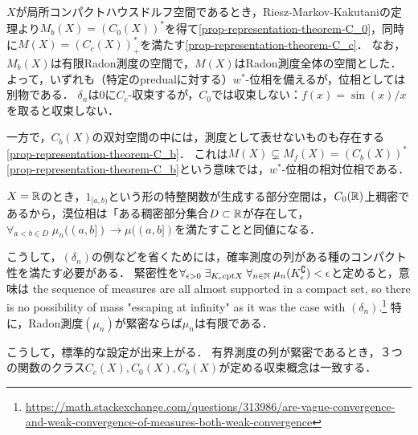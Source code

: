 \documentclass[uplatex,dvipdfmx]{jsreport}
\begin{document}
\begin{example}[局所コンパクトハウスドルフ空間での例]
    $X$が局所コンパクトハウスドルフ空間であるとき，Riesz-Markov-Kakutaniの定理より$M_b(X)=(C_0(X))^*$を得て\ref{prop-representation-theorem-C_0}，同時に$M(X)=(C_c(X))^*_+$を満たす\ref{prop-representation-theorem-C_c}．
    なお，$M_b(X)$は有限Radon測度の空間で，$M(X)$はRadon測度全体の空間とした．
    よって，いずれも（特定のpredualに対する）$w^*$-位相を備えるが，位相としては別物である．
    $\delta_n$は$0$に$C_c$-収束するが，$C_0$では収束しない：$f(x)=\sin(x)/x$を取ると収束しない．

    一方で，$C_b(X)$の双対空間の中には，測度として表せないものも存在する\ref{prop-representation-theorem-C_b}．
    これは$M(X)\subsetneq M_f(X)=(C_b(X))^*$\ref{prop-representation-theorem-C_b}という意味では，$w^*$-位相の相対位相である．
\end{example}

\begin{example}[実数上の測度の収束]
    $X=\mathbb{R}$のとき，$1_{[a,b)}$という形の特整関数が生成する部分空間は，$C_0(\mathbb{R})$上稠密であるから，漠位相は「ある稠密部分集合$D\subset\mathbb{R}$が存在して，$\forall_{a<b\in D}\;\mu_n((a,b])\to\mu((a,b])$を満たすことと同値になる．
\end{example}

\begin{remarks}
    こうして，$(\delta_n)$の例などを省くためには，確率測度の列がある種のコンパクト性を満たす必要がある．
    緊密性を$\forall_{\epsilon>0}\;\exists_{K_\epsilon\mathrm{cpt} X}\;\forall_{n\in\mathbb{N}}\;\mu_n(K_\epsilon^\complement)<\epsilon$と定めると，意味は
    the sequence of measures are all almost supported in a compact set, so there is no possibility of mass "escaping at infinity" as it was the case with $(\delta_n)$.\footnote{\url{https://math.stackexchange.com/questions/313986/are-vague-convergence-and-weak-convergence-of-measures-both-weak-convergence}}
    特に，Radon測度$(\mu_n)$が緊密ならば$\mu_n$は有限である．

    こうして，標準的な設定が出来上がる．
    有界測度の列が緊密であるとき，３つの関数のクラス$C_c(X),C_0(X),C_b(X)$が定める収束概念は一致する．
\end{remarks}
\end{document}

